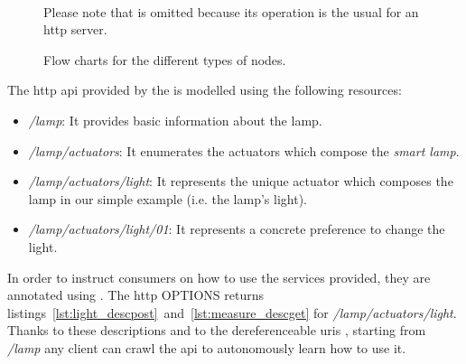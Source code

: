 \begin{figure}
        \centering %
	~ %
        ~ %
        \caption{Flow charts for the different types of nodes.}
        {Please note that \nodea{} is omitted because its operation is the usual for an \acs{http} server.} %
        \label{fig:flow_nodes}
\end{figure}



The \acs{http} \acs{api} provided by the \nodea{} is modelled using the following resources:
\begin{itemize}
  \item \emph{/lamp}: It provides basic information about the lamp.
  \item \emph{/lamp/actuators}: It enumerates the actuators which compose the \emph{smart lamp}.
  \item \emph{/lamp/actuators/light}: It represents the unique actuator which composes the lamp in our simple example (i.e. the lamp's light).
  \item \emph{/lamp/actuators/light/01}: It represents a concrete preference to change the light.
\end{itemize}



In order to instruct consumers on how to use the services provided, they are annotated using \restdesc{}.
The \acs{http} OPTIONS returns listings~\ref{lst:light_descpost}~and~\ref{lst:measure_descget} for \emph{/lamp/actuators/light}.
Thanks to these descriptions and to the dereferenceable \acsp{uri} \citep{sauermann_cool_2008}, starting from \emph{/lamp} any client can crawl the \acs{api} to autonomously learn how to use it. %


